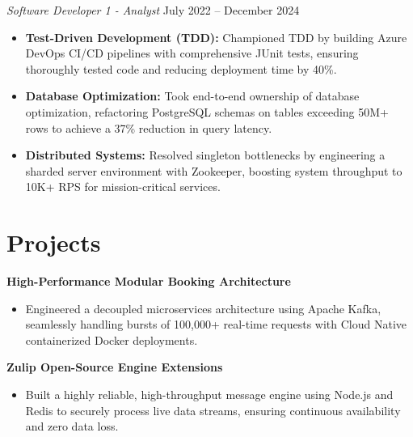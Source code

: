 \documentclass[11pt,a4paper]{article}
\begin{document}
\vspace{3pt}
\noindent
\textit{Software Developer 1 - Analyst} \hfill July 2022 -- December 2024
\begin{itemize}[leftmargin=*,noitemsep,topsep=0pt]
    \item \textbf{Test-Driven Development (TDD):} Championed TDD by building Azure DevOps CI/CD pipelines with comprehensive JUnit tests, ensuring thoroughly tested code and reducing deployment time by 40\%.
    \item \textbf{Database Optimization:} Took end-to-end ownership of database optimization, refactoring PostgreSQL schemas on tables exceeding 50M+ rows to achieve a 37\% reduction in query latency.
    \item \textbf{Distributed Systems:} Resolved singleton bottlenecks by engineering a sharded server environment with Zookeeper, boosting system throughput to 10K+ RPS for mission-critical services.
\end{itemize}

\vspace{-5pt}
\section{Projects}
\noindent
\textbf{High-Performance Modular Booking Architecture}
\begin{itemize}[leftmargin=*,noitemsep,topsep=0pt]
    \item Engineered a decoupled microservices architecture using Apache Kafka, seamlessly handling bursts of 100,000+ real-time requests with Cloud Native containerized Docker deployments.
\end{itemize}

\vspace{3pt}
\noindent
\textbf{Zulip Open-Source Engine Extensions}
\begin{itemize}[leftmargin=*,noitemsep,topsep=0pt]
    \item Built a highly reliable, high-throughput message engine using Node.js and Redis to securely process live data streams, ensuring continuous availability and zero data loss.
\end{itemize}
\end{document}
